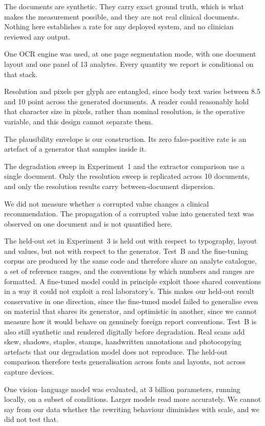 \documentclass[11pt]{article}
\begin{document}
The documents are synthetic. They carry exact ground truth, which is what makes the measurement
possible, and they are not real clinical documents. Nothing here establishes a rate for any
deployed system, and no clinician reviewed any output.

One OCR engine was used, at one page segmentation mode, with one document layout and one panel
of 13 analytes. Every quantity we report is conditional on that stack.

Resolution and pixels per glyph are entangled, since body text varies between 8.5 and 10 point
across the generated documents. A reader could reasonably hold that character size in pixels,
rather than nominal resolution, is the operative variable, and this design cannot separate them.

The plausibility envelope is our construction. Its zero false-positive rate is an artefact of a
generator that samples inside it.

The degradation sweep in Experiment~1 and the extractor comparison use a single document. Only
the resolution sweep is replicated across 10 documents, and only the resolution results carry
between-document dispersion.

We did not measure whether a corrupted value changes a clinical recommendation. The propagation
of a corrupted value into generated text was observed on one document and is not quantified
here.

The held-out set in Experiment~3 is held out with respect to typography, layout and values, but
not with respect to the generator. Test~B and the fine-tuning corpus are produced by the same
code and therefore share an analyte catalogue, a set of reference ranges, and the conventions by
which numbers and ranges are formatted. A fine-tuned model could in principle exploit those
shared conventions in a way it could not exploit a real laboratory's. This makes our held-out
result conservative in one direction, since the fine-tuned model failed to generalise even on
material that shares its generator, and optimistic in another, since we cannot measure how it
would behave on genuinely foreign report conventions. Test~B is also still synthetic and rendered
digitally before degradation. Real scans add skew, shadows,
staples, stamps, handwritten annotations and photocopying artefacts that our degradation model
does not reproduce. The held-out comparison therefore tests generalisation across fonts and
layouts, not across capture devices.

One vision--language model was evaluated, at 3 billion parameters, running locally, on a subset
of conditions. Larger models read more accurately. We cannot say from our data whether the
rewriting behaviour diminishes with scale, and we did not test that.
\end{document}
